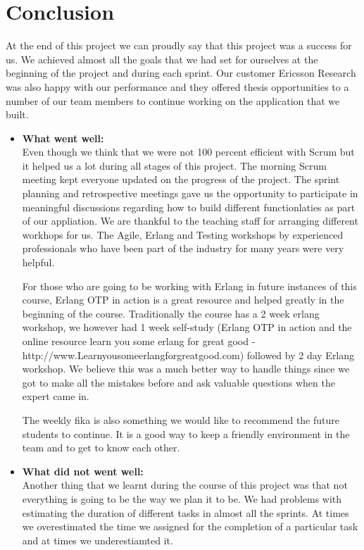 \section{Conclusion}
At the end of this project we can proudly say that this project was a success for us. We achieved almost all the goals that we had set for ourselves at the beginning of the project and during each sprint. Our customer Ericsson Research was also happy with our performance and they offered thesis opportunities to a number of our team members to continue working on the application that we built. 

\begin{itemize}
\item{\textbf{What went well:}}\\
Even though we think that we were not 100 percent efficient with Scrum but it helped us a lot during all stages of this project. The morning Scrum meeting kept everyone updated on the progress of the project. The sprint planning and retrospective meetings gave us the opportunity to participate in meaningful discussions regarding how to build different functionlaties as part of our appliation. We are thankful to the teaching staff for arranging different workhops for us. The Agile, Erlang and Testing workshops by experienced professionals who have been part of the industry for many years were very helpful. 

For those who are going to be working with Erlang in future instances of this course, Erlang OTP in action is a great resource and helped greatly in the beginning of the course. Traditionally the course has a 2 week erlang workshop, we however had 1 week self-study (Erlang OTP in action and the online resource learn you some erlang for great good - http://www.Learnyousomeerlangforgreatgood.com) followed by 2 day Erlang workshop. We believe this was a much better way to handle things since we got to make all the mistakes before and ask valuable questions when the expert came in. 

The weekly fika is also something we would like to recommend the future students to continue. It is a good way to keep a friendly environment in the team and to get to know each other.     

\item{\textbf{What did not went well:}}\\ 
Another thing that we learnt during the course of this project was that not everything is going to be the way we plan it to be. We had problems with estimating the duration of different tasks in almost all the sprints. At times we overestimated the time we assigned for the completion of a particular task and at times we underestiamted it. 


\end{itemize}
